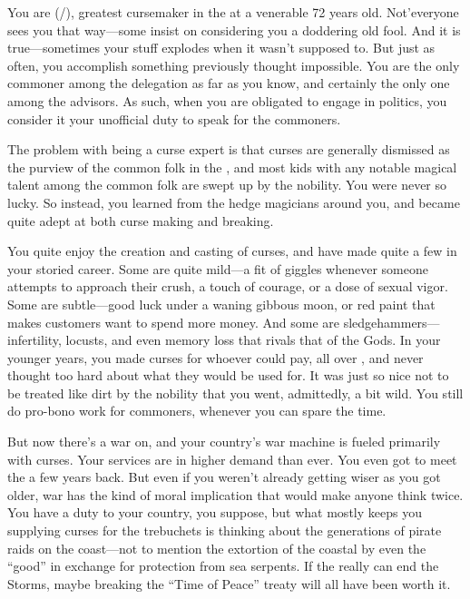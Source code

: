 \documentclass[char]{GL2020}
\begin{document}
\name{\cCurse{}}

You are \cCurse{\full} (\cCurse{\they}/\cCurse{\them}), greatest cursemaker in the \pFarm{} at a venerable 72 years old. Not'everyone sees you that way---some insist on considering you a doddering old fool. And it is true---sometimes your stuff explodes when it wasn't supposed to. But just as often, you accomplish something previously thought impossible. You are the only commoner among the \pFarm{} delegation as far as you know, and certainly the only one among the advisors. As such, when you are obligated to engage in politics, you consider it your unofficial duty to speak for the commoners.

The problem with being a curse expert is that curses are generally dismissed as the purview of the common folk in the \pFarm{}, and most kids with any notable magical talent among the common folk are swept up by the nobility. You were never so lucky. So instead, you learned from the hedge magicians around you, and became quite adept at both curse making and breaking. 

You quite enjoy the creation and casting of curses, and have made quite a few in your storied career. Some are quite mild---a fit of giggles whenever someone attempts to approach their crush, a touch of courage, or a dose of sexual vigor. Some are subtle---good luck under a waning gibbous moon, or red paint that makes customers want to spend more money. And some are sledgehammers---infertility, locusts, and even memory loss that rivals that of the Gods. In your younger years, you made curses for whoever could pay, all over \pEarth{}, and never thought too hard about what they would be used for. It was just so nice not to be treated like dirt by the \pFarm{} nobility that you went, admittedly, a bit wild. You still do pro-bono work for commoners, whenever you can spare the time.

But now there's a war on, and your country's war machine is fueled primarily with curses. Your services are in higher demand than ever. You even got to meet the \cQueen{\Majesty} a few years back. But even if you weren't already getting wiser as you got older, war has the kind of moral implication that would make anyone think twice. You have a duty to your country, you suppose, but what mostly keeps you supplying curses for the trebuchets is thinking about the generations of pirate raids on the coast---not to mention the extortion of the coastal \pFarm{} by even the ``good'' \pShippies{} in exchange for protection from sea serpents. If the \pTech{} really can end the Storms, maybe breaking the ``Time of Peace'' treaty will all have been worth it.
\end{document}
